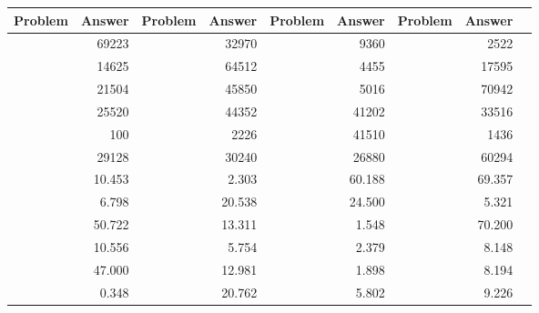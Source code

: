 \LARGE
\begin{tabular}{|l|r|r|r|r|r|r|r|r|}
\toprule
Problem &  Answer & Problem &  Answer & Problem &  Answer & Problem &  Answer \\ \midrule
\midrule
        &   69223 &         &   32970 &         &    9360 &         &    2522 \\ \midrule
        &   14625 &         &   64512 &         &    4455 &         &   17595 \\ \midrule
        &   21504 &         &   45850 &         &    5016 &         &   70942 \\ \midrule
        &   25520 &         &   44352 &         &   41202 &         &   33516 \\ \midrule
        &     100 &         &    2226 &         &   41510 &         &    1436 \\ \midrule
        &   29128 &         &   30240 &         &   26880 &         &   60294 \\ \midrule
        &  10.453 &         &   2.303 &         &  60.188 &         &  69.357 \\ \midrule
        &   6.798 &         &  20.538 &         &  24.500 &         &   5.321 \\ \midrule
        &  50.722 &         &  13.311 &         &   1.548 &         &  70.200 \\ \midrule
        &  10.556 &         &   5.754 &         &   2.379 &         &   8.148 \\ \midrule
        &  47.000 &         &  12.981 &         &   1.898 &         &   8.194 \\ \midrule
        &   0.348 &         &  20.762 &         &   5.802 &         &   9.226 \\ \midrule
\bottomrule
\end{tabular}
